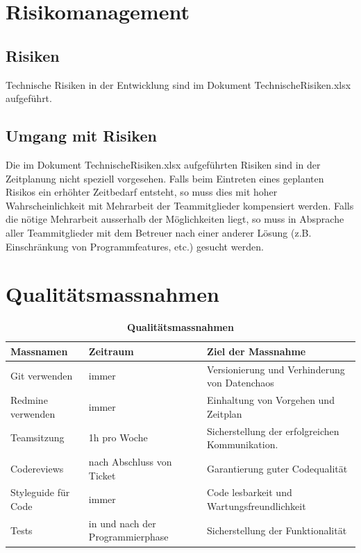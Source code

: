 \documentclass[a4,12pt]{scrartcl}
\begin{document}
\section{Risikomanagement}
\subsection{Risiken}
Technische Risiken in der Entwicklung sind im Dokument TechnischeRisiken.xlsx aufgeführt.
\subsection{Umgang mit Risiken}
Die im Dokument TechnischeRisiken.xlsx aufgeführten Risiken sind in der Zeitplanung nicht speziell vorgesehen. Falls beim Eintreten eines geplanten Risikos ein erhöhter Zeitbedarf entsteht, so muss dies mit hoher Wahrscheinlichkeit mit Mehrarbeit der Teammitglieder kompensiert werden. Falls die nötige Mehrarbeit ausserhalb der Möglichkeiten liegt, so muss in Absprache aller Teammitglieder mit dem Betreuer nach einer anderer Lösung (z.B. Einschränkung von Programmfeatures, etc.) gesucht werden.


\section{Qualitätsmassnahmen}

\begin{table}[H]
\centering
    \begin{tabular}{@{} p{3cm} p{4cm} p{6cm} @{}}\toprule    
    {Massnamen} & {Zeitraum} & {Ziel der Massnahme}\\ \midrule
    Git verwenden & immer & Versionierung und Verhinderung von Datenchaos\\ \addlinespace
    Redmine verwenden & immer & Einhaltung von Vorgehen und Zeitplan\\ \addlinespace
    Teamsitzung & 1h pro Woche & Sicherstellung der erfolgreichen Kommunikation.\\ \addlinespace
    Codereviews & nach Abschluss von Ticket & Garantierung guter Codequalität  \\ \addlinespace
    Styleguide für Code & immer & Code lesbarkeit und Wartungsfreundlichkeit\\ \addlinespace
    Tests & in und nach der Programmierphase & Sicherstellung der Funktionalität \\
    \bottomrule
    \end{tabular}
\caption{\textbf{Qualitätsmassnahmen}}
\end{table}
\end{document}
